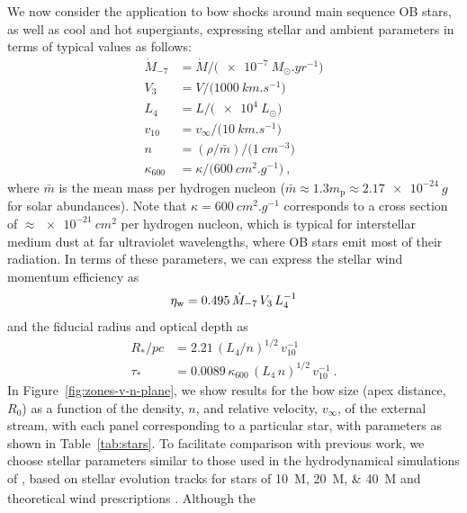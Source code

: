 We now consider the application to bow shocks around main sequence OB
stars, as well as cool and hot supergiants, expressing stellar and
ambient parameters in terms of typical values as follows:
\begin{align*}
  \label{eq:stellar-parameters}
  \dot{M}_{-7} &= \dot{M} / \bigl(\SI{e-7}{M_\odot.yr^{-1}}\bigr) \\
  V_3 &= V / \bigl(\SI{1000}{km.s^{-1}}\bigr) \\
  L_4 &= L / \bigl(\SI{e4}{L_\odot}\bigr) \\
  v_{10} &= v_\infty / \bigl( \SI{10}{km.s^{-1}} \bigr) \\
  n &= (\rho / \bar{m}) / \bigl( \SI{1}{cm^{-3}} \bigr) \\
  \kappa_{600} &= \kappa / \bigl( \SI{600}{cm^2.g^{-1}} \bigr) \ ,
\end{align*}
where \(\bar{m}\) is the mean mass per hydrogen nucleon
(\(\bar{m} \approx 1.3 m_{\text{p}} \approx \SI{2.17e-24}{g}\) for solar
abundances).  Note that \(\kappa = \SI{600}{cm^2.g^{-1}}\) corresponds to a
cross section of \(\approx \SI{e-21}{cm^2}\) per hydrogen nucleon, which is
typical for interstellar medium dust \citep{Bertoldi:1996a} at far
ultraviolet wavelengths, where OB stars emit most of their radiation.
In terms of these parameters, we can express the stellar wind momentum
efficiency as
\begin{equation}
  \label{eq:wind-eta-typical}
  \eta_{\text{w}} = \num{0.495} \,\dot{M}_{-7} \,V_3  \,L_4^{-1}
\end{equation}
and the fiducial radius and optical depth as
\begin{align}
  \label{eq:Rstar-typical}
  R_* / \si{pc} &= \num{2.21} \, (L_4 / n)^{1/2} \,v_{10}^{-1} \\
  \label{eq:taustar-typical}
  \tau_* &= \num{0.0089} \,\kappa_{600} \, (L_4 \,n)^{1/2} \,v_{10}^{-1} \ .
\end{align}
In Figure~\ref{fig:zones-v-n-plane}, we show results for the bow size
(apex distance, \(R_0\)) as a function of the density, \(n\), and
relative velocity, \(v_\infty\), of the external stream, with each panel
corresponding to a particular star, with parameters as shown in
Table~\ref{tab:stars}.  To facilitate comparison with previous work,
we choose stellar parameters similar to those used in the
hydrodynamical simulations of \citet{Meyer:2014b, Meyer:2016a,
  Meyer:2017a}, based on stellar evolution tracks for stars of
\SIlist{10;20;40}{M_\odot} \citep{Brott:2011a} and theoretical wind
prescriptions \citep{de-Jager:1988a, Vink:2000a}.  Although the
